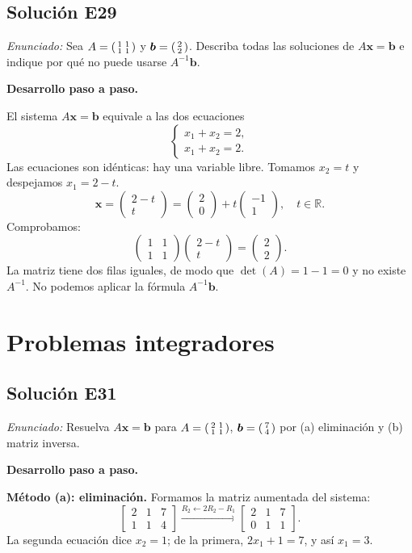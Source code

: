 \documentclass[12pt]{article}
\theoremstyle{remark}
\newcommand{\vect}[1]{\boldsymbol{#1}}
\newcommand{\solucion}[2]{\Needspace{11\baselineskip}\subsection*{Solución E#1}\noindent\textit{Enunciado:} #2\par\medskip\noindent\textbf{Desarrollo paso a paso.}\par\medskip}
\begin{document}
\solucion{29}{Sea $A=\begin{psmallmatrix}1&1\\1&1\end{psmallmatrix}$ y $\vect b=\begin{psmallmatrix}2\\2\end{psmallmatrix}$. Describa todas las soluciones de $A\vect{x}=\vect b$ e indique por qué no puede usarse $A^{-1}\vect b$.}
El sistema $A\vect x=\vect b$ equivale a las dos ecuaciones
\[
\begin{cases}x_1+x_2=2,\\x_1+x_2=2.\end{cases}
\]
Las ecuaciones son idénticas: hay una variable libre. Tomamos $x_2=t$ y despejamos $x_1=2-t$.
\[
\boxed{\vect x=\begin{pmatrix}2-t\\t\end{pmatrix}=\begin{pmatrix}2\\0\end{pmatrix}+t\begin{pmatrix}-1\\1\end{pmatrix},\quad t\in\mathbb R}.
\]
Comprobamos:
\[
\begin{pmatrix}1&1\\1&1\end{pmatrix}\begin{pmatrix}2-t\\t\end{pmatrix}=\begin{pmatrix}2\\2\end{pmatrix}.
\]
La matriz tiene dos filas iguales, de modo que $\det(A)=1-1=0$ y no existe $A^{-1}$. No podemos aplicar la fórmula $A^{-1}\vect b$.


\medskip

\section{Problemas integradores}

\solucion{31}{Resuelva $A\vect x=\vect b$ para $A=\begin{psmallmatrix}2&1\\1&1\end{psmallmatrix}$, $\vect b=\begin{psmallmatrix}7\\4\end{psmallmatrix}$ por (a) eliminación y (b) matriz inversa.}
\textbf{Método (a): eliminación.} Formamos la matriz aumentada del sistema:
\[
\left[\begin{array}{rr|r}2&1&7\\1&1&4\end{array}\right]\xrightarrow{R_2\leftarrow2R_2-R_1}\left[\begin{array}{rr|r}2&1&7\\0&1&1\end{array}\right].
\]
La segunda ecuación dice $x_2=1$; de la primera, $2x_1+1=7$, y así $x_1=3$.
\end{document}
